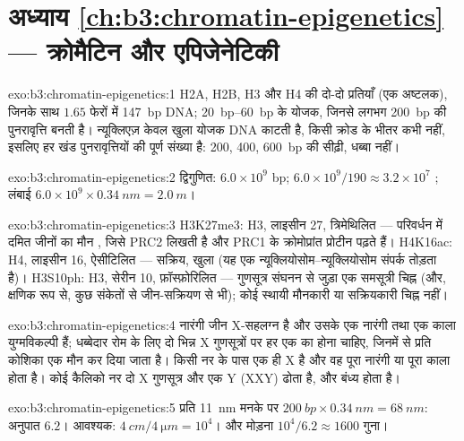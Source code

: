 \section*{अध्याय \ref{ch:b3:chromatin-epigenetics} --- क्रोमैटिन और एपिजेनेटिकी}

\begin{solution}{exo:b3:chromatin-epigenetics:1}
H2A, H2B, H3 और H4 की दो-दो प्रतियाँ (एक अष्टलक), जिनके साथ
$1.65$ फेरों में \qty{147}{bp} DNA; \qtyrange{20}{60}{bp} के योजक,
जिनसे लगभग \qty{200}{bp} की पुनरावृत्ति बनती है। न्यूक्लिएज़ केवल खुला
योजक DNA काटती है, किसी क्रोड के भीतर कभी नहीं, इसलिए हर खंड
पुनरावृत्तियों की पूर्ण संख्या है: \num{200}, \num{400},
\qty{600}{bp} की सीढ़ी, धब्बा नहीं।
\end{solution}

\begin{solution}{exo:b3:chromatin-epigenetics:2}
द्विगुणित: $6.0\times 10^{9}$ bp; $6.0\times 10^{9}/190 \approx
3.2\times 10^{7}$ ; लंबाई $6.0\times 10^{9}\times
\qty{0.34}{nm} = \qty{2.0}{m}$।
\end{solution}

\begin{solution}{exo:b3:chromatin-epigenetics:3}
H3K27me3:  H3, लाइसीन 27, त्रिमेथिलित --- परिवर्धन में दमित
जीनों का मौन , जिसे PRC2 लिखती है और PRC1 के क्रोमोप्रांत
प्रोटीन पढ़ते हैं। H4K16ac: H4, लाइसीन 16, ऐसीटिलित --- सक्रिय, खुला
 (यह एक न्यूक्लियोसोम--न्यूक्लियोसोम संपर्क तोड़ता है)।
H3S10ph: H3, सेरीन 10, फ़ॉस्फ़ोरिलित --- गुणसूत्र संघनन से जुड़ा एक
समसूत्री चिह्न (और, क्षणिक रूप से, कुछ संकेतों से जीन-सक्रियण से भी);
कोई स्थायी मौनकारी या सक्रियकारी चिह्न नहीं।
\end{solution}

\begin{solution}{exo:b3:chromatin-epigenetics:4}
नारंगी जीन X-सहलग्न है और उसके एक नारंगी तथा एक काला युग्मविकल्पी हैं;
धब्बेदार रोम के लिए दो भिन्न X गुणसूत्रों पर हर एक का होना चाहिए,
जिनमें से प्रति कोशिका एक मौन कर दिया जाता है। किसी नर के पास एक ही X
है और वह पूरा नारंगी या पूरा काला होता है। कोई कैलिको नर दो X गुणसूत्र
और एक Y (XXY) ढोता है, और बंध्य होता है।
\end{solution}

\begin{solution}{exo:b3:chromatin-epigenetics:5}
प्रति \qty{11}{nm} मनके पर
$\qty{200}{bp}\times \qty{0.34}{nm} = \qty{68}{nm}$: अनुपात $6.2$।
आवश्यक: $\qty{4}{cm}/\qty{4}{\micro m} =
10^{4}$। और मोड़ना $10^{4}/6.2 \approx 1600$ गुना।
\end{solution}

